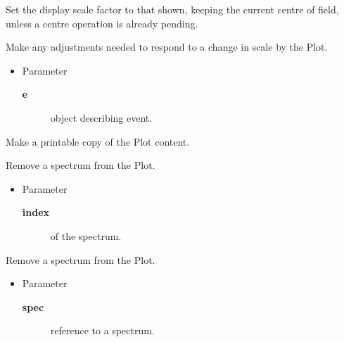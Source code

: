 \begin{desc}Set the display scale factor to that shown, keeping the current
 centre of field, unless a centre operation is already pending.
\end{desc}

\begin{desc}Make any adjustments needed to respond to a change in scale by
 the Plot.
\begin{itemize}
\item{Parameter
  \begin{description}
   \item[\textbf{e}]{object describing event.}
  \end{description}}
\end{itemize}
\end{desc}

\begin{desc}Make a printable copy of the Plot content.
\end{desc}

\begin{desc}Remove a spectrum from the Plot.
\begin{itemize}
\item{Parameter
  \begin{description}
   \item[\textbf{index}]{of the spectrum.}
  \end{description}}
\end{itemize}
\end{desc}

\begin{desc}Remove a spectrum from the Plot.
\begin{itemize}
\item{Parameter
  \begin{description}
   \item[\textbf{spec}]{reference to a spectrum.}
  \end{description}}
\end{itemize}
\end{desc}


